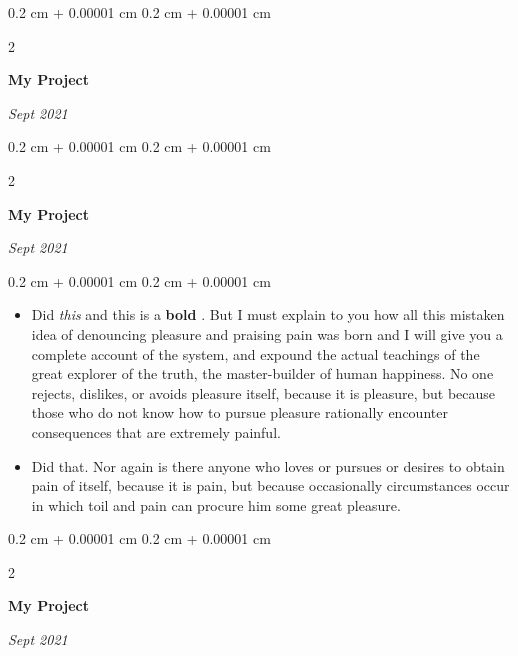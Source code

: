 \documentclass[10pt, letterpaper]{article}
\newenvironment{highlights}{
    \begin{itemize}[
        topsep=0.10 cm,
        parsep=0.10 cm,
        partopsep=0pt,
        itemsep=0pt,
        leftmargin=0.4 cm + 10pt
    ]
}{
    \end{itemize}
} %
\newenvironment{onecolentry}{
    \begin{adjustwidth}{
        0.2 cm + 0.00001 cm
    }{
        0.2 cm + 0.00001 cm
    }
}{
    \end{adjustwidth}
} %
\newenvironment{twocolentry}[2][]{
    \onecolentry
    \def\secondColumn{#2}
    \setcolumnwidth{\fill, 4.5 cm}
    \begin{paracol}{2}
}{
    \switchcolumn \raggedleft \secondColumn
    \end{paracol}
    \endonecolentry
} %
\let\hrefWithoutArrow\href
\renewcommand{\href}[2]{\hrefWithoutArrow{#1}{\ifthenelse{\equal{#2}{}}{ }{#2 }\raisebox{.15ex}{\footnotesize \faExternalLink*}}}
\begin{document}
        \begin{twocolentry}{
            
            
        \textit{Sept 2021}}
            \textbf{My Project}
        \end{twocolentry}



        \vspace{0.2 cm}

        \begin{twocolentry}{
            
            
        \textit{Sept 2021}}
            \textbf{My Project}
        \end{twocolentry}

        \vspace{0.10 cm}
        \begin{onecolentry}
            \begin{highlights}
                \item Did \textit{this} and this is a \textbf{bold} \href{https://example.com}{link}. But I must explain to you how all this mistaken idea of denouncing pleasure and praising pain was born and I will give you a complete account of the system, and expound the actual teachings of the great explorer of the truth, the master-builder of human happiness. No one rejects, dislikes, or avoids pleasure itself, because it is pleasure, but because those who do not know how to pursue pleasure rationally encounter consequences that are extremely painful.
                \item Did that. Nor again is there anyone who loves or pursues or desires to obtain pain of itself, because it is pain, but because occasionally circumstances occur in which toil and pain can procure him some great pleasure.
            \end{highlights}
        \end{onecolentry}


        \vspace{0.2 cm}

        \begin{twocolentry}{
            
            
        \textit{Sept 2021}}
            \textbf{My Project}
        \end{twocolentry}
\end{document}

